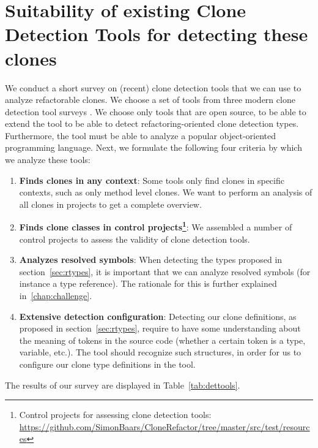 \section{Suitability of existing Clone Detection Tools for detecting these clones}
\label{ch:tool-overview}
We conduct a short survey on (recent) clone detection tools that we can use to analyze refactorable clones. We choose a set of tools from three modern clone detection tool surveys \cite{roy2009comparison, svajlenko2014evaluating, sheneamer2016survey}. We choose only tools that are open source, to be able to extend the tool to be able to detect refactoring-oriented clone detection types. Furthermore, the tool must be able to analyze a popular object-oriented programming language. Next, we formulate the following four criteria by which we analyze these tools:
\begin{enumerate}
    \item \textbf{Finds clones in any context}: Some tools only find clones in specific contexts, such as only method level clones. We want to perform an analysis of all clones in projects to get a complete overview.
\item \textbf{Finds clone classes in control projects\footnote{Control projects for assessing clone detection tools: \url{https://github.com/SimonBaars/CloneRefactor/tree/master/src/test/resources}}}: We assembled a number of control projects to assess the validity of clone detection tools.
\item \textbf{Analyzes resolved symbols}: When detecting the types proposed in section~\ref{sec:rtypes}, it is important that we can analyze resolved symbols (for instance a type reference). The rationale for this is further explained in~\ref{chap:challenge}.
\item \textbf{Extensive detection configuration}: Detecting our clone definitions, as proposed in section~\ref{sec:rtypes}, require to have some understanding about the meaning of tokens in the source code (whether a certain token is a type, variable, etc.). The tool should recognize such structures, in order for us to configure our clone type definitions in the tool.
\end{enumerate}
The results of our survey are displayed in Table~\ref{tab:dettools}.


